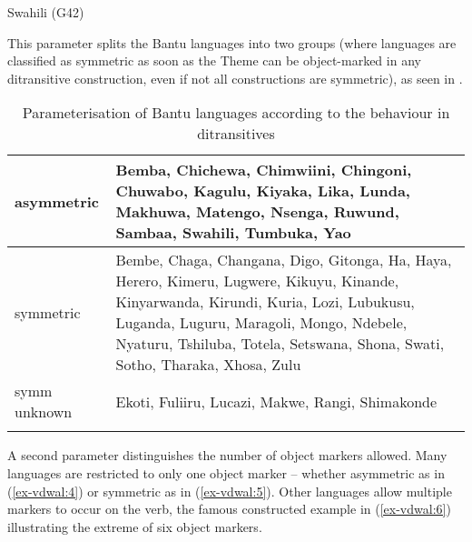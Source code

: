 \documentclass[output=paper
,modfonts
,nonflat]{langsci/langscibook}
\begin{document}
\begin{exe}
\ex Swahili (G42) \label{ex-vdwal:3}
	\xlist
	\endxlist
\end{exe}
This parameter splits the Bantu languages into two groups (where languages are classified as symmetric as soon as the Theme can be object-marked in any ditransitive construction, even if not all constructions are symmetric), as seen in .

\begin{table}[hb]
\caption{Parameterisation of Bantu languages according to the behaviour in ditransitives}
\label{Table 1}	
	\begin{tabularx}{\textwidth}{lX}
	\lsptoprule
	asymmetric & Bemba, Chichewa, Chimwiini, Chingoni, Chuwabo, Kagulu, Kiyaka,
	Lika, Lunda, Makhuwa, Matengo, Nsenga, Ruwund, Sambaa, Swahili, Tumbuka, Yao\\ 
	\midrule
	symmetric & Bembe, Chaga, Changana, Digo, Gitonga, Ha, Haya, Herero, Kimeru, Lugwere, Kikuyu, Kinande, Kinyarwanda, Kirundi, Kuria, Lozi, Lubukusu, Luganda, Luguru, Maragoli, Mongo, Ndebele, Nyaturu, Tshiluba, Totela, Setswana, Shona, Swati, Sotho, Tharaka, Xhosa, Zulu\\ 
	\midrule
	symm unknown & Ekoti, Fuliiru, Lucazi, Makwe, Rangi, Shimakonde\\
	\lspbottomrule
	\end{tabularx}
\end{table}

\hspace{-0.7202pt}A second parameter distinguishes the number of object markers allowed. Many languages are restricted to only one object marker -- whether asymmetric as in (\ref{ex-vdwal:4}) or symmetric as in (\ref{ex-vdwal:5}). Other languages allow multiple markers to occur on the verb, the famous constructed example in (\ref{ex-vdwal:6}) illustrating the extreme of six object markers.
\end{document}
